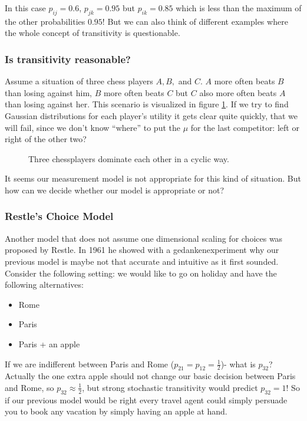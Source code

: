 \documentclass[../main/Notes.tex]{subfiles}
\begin{document}
In this case $p_{ij} = 0.6$, $p_{jk}=0.95$ but $p_{ik} = 0.85$ which is less than the maximum of the other probabilities $0.95$! But we can also think of different examples where the whole concept of transitivity is questionable.

\subsubsection{Is transitivity reasonable?}
Assume a situation of three chess players $A, B,$ and $C$. $A$ more often beats $B$ than losing against him, $B$ more often beats $C$ but $C$ also more often beats $A$ than losing against her. This scenario is visualized in figure \ref{fig:2014-07-04-chesscycle}. If we try to find Gaussian distributions for each player's utility it gets clear quite quickly, that we will fail, since we don't know ``where'' to put the $\mu$ for the last competitor: left or right of the other two?

\begin{figure}[ht]
  \centering
  \caption{Three chessplayers dominate each other in a cyclic way.}
  \label{fig:2014-07-04-chesscycle}
\end{figure}

It seems our measurement model is not appropriate for this kind of situation. But how can we decide whether our model is appropriate or not?

\subsubsection{Restle's Choice Model}
Another model that does not assume one dimensional scaling for choices was proposed by Restle. In 1961 he showed with a gedankenexperiment why our previous model is maybe not that accurate and intuitive as it first sounded. Consider the following setting: we would like to go on holiday and have the following alternatives:
\begin{itemize}
  \item Rome
	\item Paris
  \item Paris + an apple
\end{itemize}
If we are indifferent between Paris and Rome ($p_{21} = p_{12} = \frac{1}{2}$)- what is $p_{32}$? Actually the one extra apple should not change our basic decision between Paris and Rome, so $p_{32} \approx \frac{1}{2}$, but strong stochastic transitivity would predict $p_{32} = 1$! So if our previous model would be right every travel agent could simply persuade you to book any vacation by simply having an apple at hand.
\end{document}
